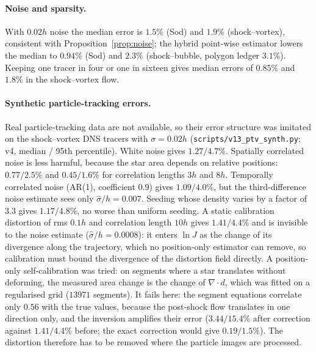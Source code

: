 \documentclass[11pt]{article}
\theoremstyle{definition}\newtheorem{definition}{Definition}\theoremstyle{remark}\newtheorem{remark}{Remark}
\begin{document}
\paragraph{Noise and sparsity.} With $0.02h$ noise the median error is $1.5\%$ (Sod) and $1.9\%$ (shock--vortex), consistent with Proposition~\ref{prop:noise}; the hybrid point-wise estimator lowers the median to $0.94\%$ (Sod) and $2.3\%$ (shock--bubble, polygon ledger $3.1\%$). Keeping one tracer in four or one in sixteen gives median errors of $0.85\%$ and $1.8\%$ in the shock--vortex flow.

\paragraph{Synthetic particle-tracking errors.} Real particle-tracking data are not available, so their error structure was imitated on the shock--vortex DNS tracers with $\sigma=0.02h$ (\texttt{scripts/v13\_ptv\_synth.py}; v4, median / 95th percentile). White noise gives $1.27 / 4.7\%$. Spatially correlated noise is less harmful, because the star area depends on relative positions: $0.77 / 2.5\%$ and $0.45 / 1.6\%$ for correlation lengths $3h$ and $8h$. Temporally correlated noise (AR(1), coefficient $0.9$) gives $1.09 / 4.0\%$, but the third-difference noise estimate sees only $\hat\sigma/h=0.007$. Seeding whose density varies by a factor of $3.3$ gives $1.17 / 4.8\%$, no worse than uniform seeding. A static calibration distortion of rms $0.1h$ and correlation length $10h$ gives $1.41 / 4.4\%$ and is invisible to the noise estimate ($\hat\sigma/h=0.0008$): it enters $\ln J$ as the change of its divergence along the trajectory, which no position-only estimator can remove, so calibration must bound the divergence of the distortion field directly. A position-only self-calibration was tried: on segments where a star translates without deforming, the measured area change is the change of $\nabla\!\cdot\!d$, which was fitted on a regularised grid ($13971$ segments). It fails here: the segment equations correlate only $0.56$ with the true values, because the post-shock flow translates in one direction only, and the inversion amplifies their error ($3.44 / 15.4\%$ after correction against $1.41 / 4.4\%$ before; the exact correction would give $0.19 / 1.5\%$). The distortion therefore has to be removed where the particle images are processed.
\end{document}
